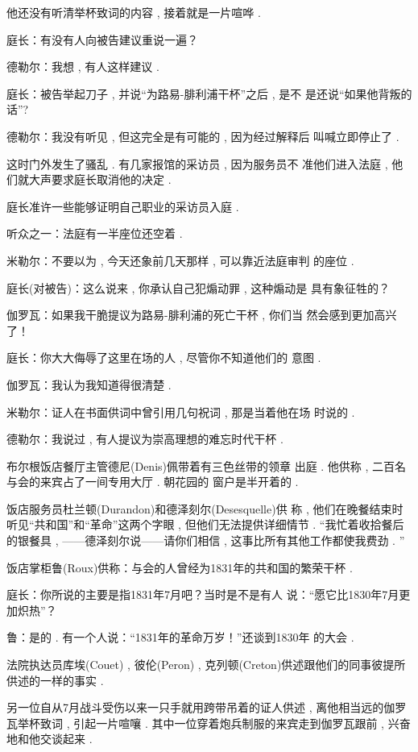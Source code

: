 他还没有听清举杯致词的内容 , 接着就是一片喧哗 . 

庭长：有没有人向被告建议重说一遍？

德勒尔：我想 , 有人这样建议 . 

庭长：被告举起刀子 , 并说“为路易-腓利浦干杯”之后 , 是不 是还说“如果他背叛的话”?

德勒尔：我没有听见 , 但这完全是有可能的 , 因为经过解释后 叫喊立即停止了 . 

这时门外发生了骚乱 . 有几家报馆的采访员 , 因为服务员不 准他们进入法庭 , 他们就大声要求庭长取消他的决定 . 

庭长准许一些能够证明自己职业的采访员入庭 . 

听众之一：法庭有一半座位还空着 . 

米勒尔：不要以为 , 今天还象前几天那样 , 可以靠近法庭审判 的座位 . 

庭长(对被告)：这么说来 , 你承认自己犯煽动罪 , 这种煽动是 具有象征牲的？

伽罗瓦：如果我干脆提议为路易-腓利浦的死亡干杯 , 你们当 然会感到更加高兴了！

庭长：你大大侮辱了这里在场的人 , 尽管你不知道他们的 意图 . 

伽罗瓦：我认为我知道得很清楚 . 

米勒尔：证人在书面供词中曾引用几句祝词 , 那是当着他在场 时说的 . 

德勒尔：我说过 , 有人提议为崇高理想的难忘时代干杯 . 

布尔根饭店餐厅主管德尼(Denis)佩带着有三色丝带的领章 出庭 . 他供称 , 二百名与会的来宾占了一间专用大厅 . 朝花园的 窗户是半开着的 . 

饭店服务员杜兰顿(Durandon)和德泽刻尔(Desesquelle)供 称 , 他们在晚餐结束时听见“共和国”和“革命”这两个字眼 , 但他们无法提供详细情节 . “我忙着收拾餐后的银餐具 , ——德泽刻尔说——请你们相信 , 这事比所有其他工作都使我费劲 . ”

饭店掌柜鲁(Roux)供称：与会的人曾经为1831年的共和国的繁荣干杯 . 

庭长：你所说的主要是指1831年7月吧？当时是不是有人 说：“愿它比1830年7月更加炽热”？

鲁：是的 . 有一个人说：“1831年的革命万岁！”还谈到1830年 的大会 . 

法院执达员库埃(Couet) , 彼伦(Peron) , 克列顿(Creton)供述跟他们的同事彼提所供述的一样的事实 . 

另一位自从7月战斗受伤以来一只手就用跨带吊着的证人供述 , 离他相当远的伽罗瓦举杯致词 , 引起一片喧嚷 . 其中一位穿着炮兵制服的来宾走到伽罗瓦跟前 , 兴奋地和他交谈起来 . 

